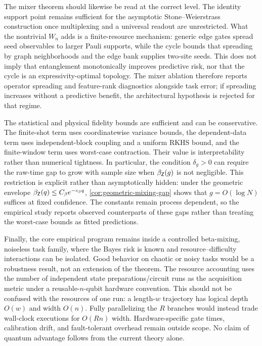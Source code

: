 The mixer theorem should likewise be read at the correct level.  The identity
support point remains sufficient for the asymptotic Stone--Weierstrass
construction once multiplexing and a universal readout are unrestricted.
What the nontrivial $W_n$ adds is a finite-resource mechanism: generic edge
gates spread seed observables to larger Pauli supports, while the cycle bounds
that spreading by graph neighborhoods and the edge bank supplies two-site
seeds.  This does not imply that entanglement monotonically improves predictive
risk, nor that the cycle is an expressivity-optimal topology.  The mixer
ablation therefore reports operator spreading and feature-rank diagnostics
alongside task error; if spreading increases without a predictive benefit, the
architectural hypothesis is rejected for that regime.

The statistical and physical fidelity bounds are sufficient and can be
conservative.  The finite-shot term uses coordinatewise variance bounds, the
dependent-data term uses independent-block coupling and a uniform RKHS bound,
and the finite-window term uses worst-case contraction.  Their value is
interpretability rather than numerical tightness.  In particular, the
condition $\delta_g>0$ can require the raw-time gap to grow with sample size
when $\beta_{\mathsf Z}(g)$ is not negligible.  This restriction is explicit
rather than asymptotically hidden: under the geometric envelope
$\beta_{\mathsf Z}(q)\leq C_{\beta} e^{-c_{\beta} q}$,
\cref{cor:geometric-mixing-gap} shows that $g=O(\log N)$ suffices at fixed
confidence.  The constants remain process dependent, so the empirical study
reports observed counterparts of these gaps rather than treating the
worst-case bounds as fitted predictions.

Finally, the core empirical program remains inside a controlled beta-mixing,
noiseless task family, where the Bayes risk is known and resource--difficulty
interactions can be isolated.  Good behavior on chaotic or noisy tasks would
be a robustness result, not an extension of the theorem.  The resource
accounting uses the number of independent state preparations/circuit runs as
the acquisition metric under a reusable-$n$-qubit hardware convention.  This
should not be confused with the resources of one run: a length-$w$ trajectory
has logical depth $O(w)$ and width $O(n)$.  Fully parallelizing the $R$ branches
would instead trade wall-clock executions for $O(Rn)$ width.  Hardware-specific
gate times, calibration drift, and
fault-tolerant overhead remain outside scope.  No claim of quantum advantage
follows from the current theory alone.
